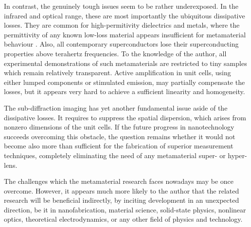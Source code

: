 In contrast, the genuinely tough issues seem to be rather underexposed. In the infrared and optical range, these are most importantly the ubiquitous dissipative losses. They are common for high-permitivity dielectrics and metals, where the permittivity of any known low-loss material appears insufficient for metamaterial behaviour \cite{dominec2014transition}. Also, all contemporary superconductors lose their superconducting properties above terahertz frequencies. To the knowledge of the author, all experimental demonstrations of such metamaterials are restricted to tiny samples which remain relatively transparent. Active amplification in unit cells, using either lumped components \cite{jelinek2011fet} or stimulated emission, may partially compensate the losses, but it appears very hard to achieve a sufficient linearity and homogeneity. 

The sub-diffraction imaging has yet another fundamental issue aside of the dissipative losses. It requires to suppress the spatial dispersion, which arises from nonzero dimensions of the unit cells. If the future progress in nanotechnology succeeds overcoming this obstacle, the question remains whether it would not become also more than sufficient for the fabrication of superior measurement techniques, completely eliminating the need of any metamaterial super- or hyper-lens. 

The challenges which the metamaterial research faces nowadays may be once overcome. However, it appears much more likely to the author that the related research will be beneficial indirectly, by inciting development in an unexpected direction, be it in nanofabrication, material science, solid-state physics, nonlinear optics, theoretical electrodynamics, or any other field of physics and technology.

